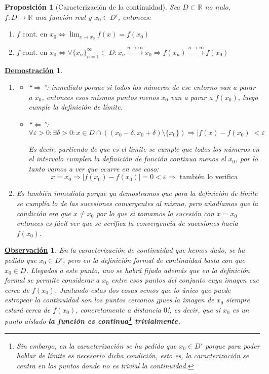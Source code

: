 \documentclass[10pt,a4paper,openright]{book}
\theoremstyle{break}
\newtheorem{prop}{Proposición}[chapter]
\newtheorem*{demo}{\underline{Demostración}}
\newtheorem{obs}{\underline{Observación}}[chapter]
\begin{document}
\begin{prop}[Caracterización de la continuidad]
Sea $D\subset \mathbb R$ no nulo, $f: D\longrightarrow \mathbb R$ una función real y $x_0\in D'$, entonces:
\begin{enumerate}
\item $f\mbox{ cont. en }x_0 \Leftrightarrow \lim_{x\rightarrow x_0} f(x)=f(x_0)$
\item $f\mbox{ cont. en }x_0 \Leftrightarrow \forall \{x_n\}_{n=1}^\infty\subset D: x_n\xrightarrow{n\rightarrow \infty} x_0\Rightarrow f(x_n)\xrightarrow{n\rightarrow \infty} f(x_0)$
\end{enumerate}
\end{prop}
\begin{demo}
\begin{enumerate}
\item 
\begin{itemize}
\item ``$\Rightarrow $'': inmediato porque si todos los números de ese entorno van a parar a $x_0$, entonces esos mismos puntos menos $x_0$ van a parar a $f(x_0)$, luego cumple la definición de límite.

\item ``$\Leftarrow$'':
$$\forall \varepsilon>0 : \exists \delta >0 : x\in D\cap\left( (x_0-\delta, x_0+\delta)\mbox{\textbackslash}\{x_0\}\right)\Rightarrow |f(x)-f(x_0)|<\varepsilon$$

Es decir, partiendo de que es el límite se cumple que todos los números en el intervalo cumplen la definición de función continua menos el $x_0$, por lo tanto vamos a ver que ocurre en ese caso:
$$x=x_0\Rightarrow |f(x_0)-f(x_0)|=0<\varepsilon\Rightarrow \mbox{ también lo verifica}$$
\end{itemize}

\item Es también inmediata porque ya demostramos que para la definición de límite se cumplía lo de las sucesiones convergentes al mismo, pero añadíamos que la condición era que $x\neq x_0$ por lo que si tomamos la sucesión con $x=x_0$ entonces es fácil ver que se verifica la convergencia de sucesiones hacia $f(x_0)$.
\end{enumerate}
\end{demo}

\begin{obs}
En la caracterización de continuidad que hemos dado, se ha pedido que $x_0\in D'$, pero en la definición formal de continuidad basta con que $x_0\in D$. Llegados a este punto, uno se habrá fijado además que en la definición formal se permite considerar a $x_0$ entre esos puntos del conjunto cuya imagen cae cerca de $f(x_0)$. Juntando estas dos cosas vemos que lo único que puede estropear la continuidad son los puntos cercanos ¡pues la imagen de $x_0$ siempre estará cerca de $f(x_0)$, concretamente a distancia $0$!, es decir, que si $x_0$ es un punto aislado \textbf{la función es continua\footnote{Sin embargo, en la caracterización se ha pedido que $x_0\in D'$ porque para poder hablar de límite es necesario dicha condición, esto es, la caracterización se centra en los puntos donde no es trivial la continuidad.} trivialmente.}
\end{obs}
\end{document}
